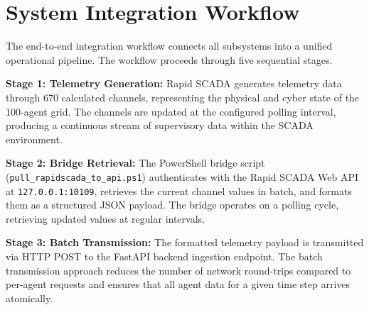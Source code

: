 \section{System Integration Workflow}
\label{sec:integration}

The end-to-end integration workflow connects all subsystems into a unified operational pipeline. The workflow proceeds through five sequential stages.

\par \vspace{0.35cm}
\noindent
\textbf{Stage 1: Telemetry Generation:} Rapid SCADA generates telemetry data through 670 calculated channels, representing the physical and cyber state of the 100-agent grid. The channels are updated at the configured polling interval, producing a continuous stream of supervisory data within the SCADA environment.

\par \vspace{0.35cm}
\noindent
\textbf{Stage 2: Bridge Retrieval:} The PowerShell bridge script (\mbox{\texttt{pull\_rapidscada\_to\_api.ps1}}) authenticates with the Rapid SCADA Web API at \texttt{127.0.0.1:10109}, retrieves the current channel values in batch, and formats them as a structured JSON payload. The bridge operates on a polling cycle, retrieving updated values at regular intervals.

\par \vspace{0.35cm}
\noindent
\textbf{Stage 3: Batch Transmission:} The formatted telemetry payload is transmitted via HTTP POST to the FastAPI backend ingestion endpoint. The batch transmission approach reduces the number of network round-trips compared to per-agent requests and ensures that all agent data for a given time step arrives atomically.

